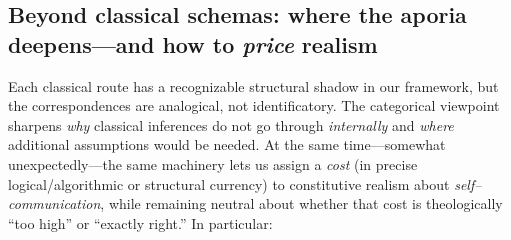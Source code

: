 \documentclass[11pt]{article}
\theoremstyle{upright}
\begin{document}
\subsection{Beyond classical schemas: where the aporia deepens—and how to \emph{price} realism}
Each classical route has a recognizable structural shadow in our framework, but the correspondences are analogical, not identificatory. The categorical viewpoint sharpens \emph{why} classical inferences do not go through \emph{internally} and \emph{where} additional assumptions would be needed. At the same time—somewhat unexpectedly—the same machinery lets us assign a \emph{cost} (in precise logical/algorithmic or structural currency) to constitutive realism about \emph{self–communication}, while remaining neutral about whether that cost is theologically “too high” or “exactly right.” In particular:
\end{document}
